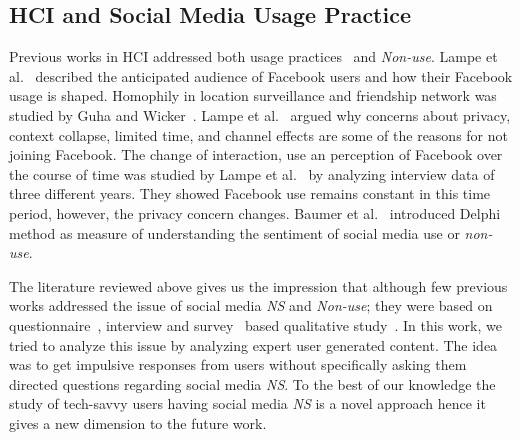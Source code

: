 \subsection{HCI and Social Media Usage Practice}

Previous works in HCI addressed both usage practices~\cite{grudin1988cscw} and \emph{Non-use}. Lampe et al.~\cite{lampe2006face} described the anticipated audience of Facebook users and how their Facebook usage is shaped. Homophily in location surveillance and friendship network was studied by Guha and Wicker~\cite{guha2015birds}. Lampe et al.~\cite{lampe2013users} argued why concerns about privacy, context collapse, limited time, and channel effects are some of the reasons for not joining Facebook. The change of interaction, use an perception of Facebook over the course of time was studied by Lampe et al.~\cite{lampe2008changes} by analyzing interview data of three different years. They showed Facebook use remains constant in this time period, however, the privacy concern changes. Baumer et al.~\cite{baumer2017subjects} introduced Delphi method as measure of understanding the sentiment of social media use or \emph{non-use}.




The literature reviewed above gives us the impression that although few previous works addressed the issue of social media \emph{NS} and \textit{Non-use}; they were based on questionnaire~\cite{hampton2015social, baker2011their}, interview\cite{turan2013reasons} and survey~\cite{baumer2015missing, brody2018opting} based qualitative study~\cite{baumer2013limiting, nonnecke2001lurkers}. In this work, we tried to analyze this issue by analyzing expert user generated content. The idea was to get impulsive responses from users without specifically asking them directed questions regarding social media \emph{NS}. To the best of our knowledge the study of tech-savvy users having social media \emph{NS} is a novel approach hence it gives a new dimension to the future work. 